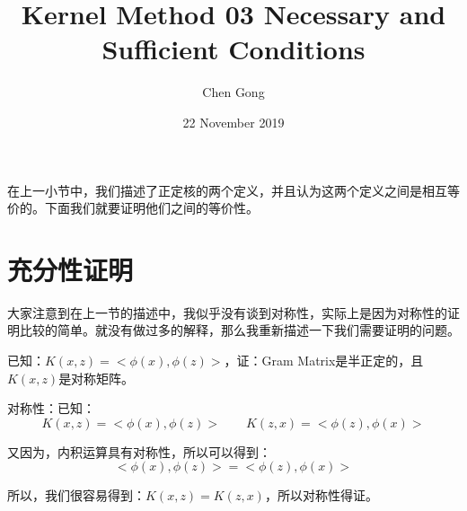 \documentclass[a4paper]{article}
\title{Kernel Method 03 Necessary and Sufficient Conditions}
\author{Chen Gong}
\date{22 November 2019}
\begin{document}
\maketitle
在上一小节中，我们描述了正定核的两个定义，并且认为这两个定义之间是相互等价的。下面我们就要证明他们之间的等价性。
\section{充分性证明}
大家注意到在上一节的描述中，我似乎没有谈到对称性，实际上是因为对称性的证明比较的简单。就没有做过多的解释，那么我重新描述一下我们需要证明的问题。

已知：$K(x,z) = <\phi(x),\phi(z)>$，证：Gram Matrix是半正定的，且$K(x,z)$是对称矩阵。

对称性：已知：
\begin{equation}
    K(x,z)=<\phi(x),\phi(z)> \qquad K(z,x) = <\phi(z),\phi(x)>
\end{equation}

又因为，内积运算具有对称性，所以可以得到：
\begin{equation}
    <\phi(x),\phi(z)> = <\phi(z),\phi(x)>
\end{equation}

所以，我们很容易得到：$K(x,z)=K(z,x)$，所以对称性得证。

~\\
\end{document}
